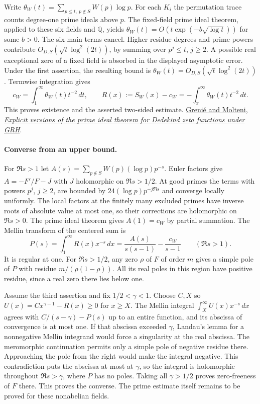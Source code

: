 Write $\theta_W(t)=\sum_{p\le t,\ p\notin S}W(p)\log p$. For each
$K_i$ the permutation trace counts degree-one prime ideals above $p$.
The fixed-field prime ideal theorem, applied to these six fields and
$\mathbb Q$, yields $\theta_W(t)=O(t\exp(-b\sqrt{\log t}))$ for some
$b>0$. The six main terms cancel. Higher residue degrees and prime
powers contribute $O_{D,S}(\sqrt t\log^2(2t))$, by summing over
$p^j\le t$, $j\ge2$. A possible real exceptional zero of a fixed field
is absorbed in the displayed asymptotic error. Under the first assertion,
the resulting bound is $\theta_W(t)=O_{D,S}(\sqrt t\log^2(2t))$.
Termwise integration gives
\[
 c_W=\int_1^\infty \theta_W(t)t^{-2}\,dt,\qquad
 R(x):=S_W(x)-c_W=-\int_x^\infty\theta_W(t)t^{-2}\,dt.
\]
This proves existence and the asserted two-sided estimate.
\href{https://arxiv.org/abs/1312.4463}{Greni\'e and Molteni,
\emph{Explicit versions of the prime ideal theorem for Dedekind zeta functions under GRH}}.

\paragraph{Converse from an upper bound.}
For $\Re s>1$ let $A(s)=\sum_{p\notin S}W(p)(\log p)p^{-s}$.
Euler factors give $A=-F'/F-J$ with $J$ holomorphic on $\Re s>1/2$.
At good primes the terms with powers $p^j$, $j\ge2$, are bounded by
$24(\log p)p^{-j\Re s}$ and converge locally uniformly.
The local factors at the finitely many excluded primes have inverse
roots of absolute value at most one, so their corrections are
holomorphic on $\Re s>0$. The prime ideal theorem gives $A(1)=c_W$
by partial summation. The Mellin transform of the centered sum is
\[
 P(s)=\int_1^\infty R(x)x^{-s}\,dx
     =\frac{A(s)}{s(s-1)}-\frac{c_W}{s-1}\qquad(\Re s>1).
\]
It is regular at one. For $\Re s>1/2$, any zero $\rho$ of $F$ of order
$m$ gives a simple pole of $P$ with residue $m/(\rho(1-\rho))$.
All its real poles in this region have positive residue, since a real
zero there lies below one.

Assume the third assertion and fix $1/2<\gamma<1$. Choose $C,X$
so $U(x)=Cx^{\gamma-1}-R(x)\ge0$ for $x\ge X$.
The Mellin integral $\int_X^\infty U(x)x^{-s}\,dx$ agrees with
$C/(s-\gamma)-P(s)$ up to an entire function, and its abscissa of
convergence is at most one. If that abscissa exceeded $\gamma$,
Landau's lemma for a nonnegative Mellin integrand would force a
singularity at the real abscissa. The meromorphic continuation permits
only a simple pole of negative residue there. Approaching the pole
from the right would make the integral negative. This contradiction
puts the abscissa at most at $\gamma$, so the integral is holomorphic
throughout $\Re s>\gamma$, where $P$ has no poles. Taking all
$\gamma>1/2$ proves zero-freeness of $F$ there. This proves the
converse. The prime estimate itself remains to be proved for these
nonabelian fields.

